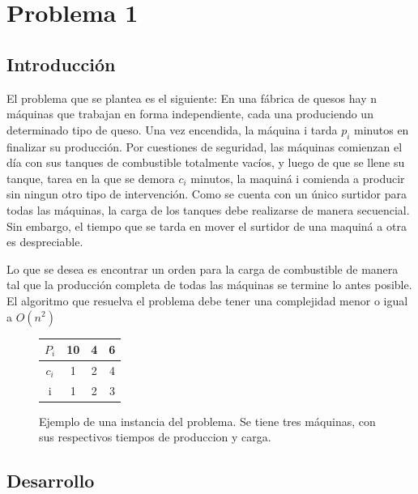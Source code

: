 \section{Problema 1}
 
\subsection{Introducci\'on}
El problema que se plantea es el siguiente: 
En una f\'abrica de quesos hay n m\'aquinas que trabajan en forma independiente, cada una produciendo un
determinado tipo de queso. Una vez encendida, la m\'aquina i tarda $p_i$ minutos en finalizar su producci\'on.
Por cuestiones de seguridad, las m\'aquinas comienzan el d\'ia con sus tanques de combustible totalmente vac\'ios, y
 luego de que se llene su tanque, tarea en la que se demora $c_i$ minutos, la maquin\'a i comienda a producir sin ningun otro tipo de intervenci\'on.
Como se cuenta con un \'unico surtidor para todas las m\'aquinas, la carga de los tanques debe realizarse de manera secuencial.
Sin embargo, el tiempo que se tarda en mover el surtidor de una maquin\'a a otra es despreciable.

Lo que se desea es encontrar un orden para la carga de combustible de manera tal que la producci\'on completa de
todas las m\'aquinas se termine lo antes posible. El algoritmo que resuelva el problema debe tener una complejidad menor o igual a $O(n^2)$

\vspace{2em}
\begin{figure}[h!]
    \begin{center}
		\centering
		\begin{tabular}[c]{|c|c|c|c|}
		    \hline
		    $P_i$ & 10 & 4 & 6 \\
		    \hline
		    $c_i$ &  1 & 2 & 4  \\
		    \hline
		    \rowcolor[gray]{.9}
		    i & 1 & 2 & 3  \\
		    \hline
		\end{tabular}
		\caption{Ejemplo de una instancia del problema. Se tiene tres m\'aquinas, con sus respectivos tiempos de produccion y carga.}   
		\label{fig:ej1Ejemplos}
    \end{center}
\end{figure}
 
 
\subsection{Desarrollo}
 
